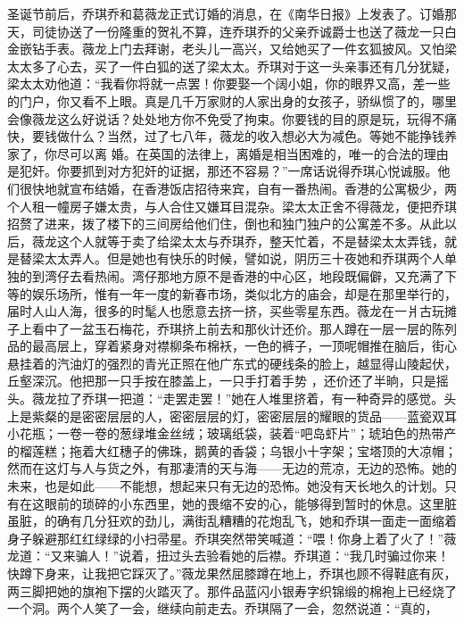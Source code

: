 \documentclass{article}
\begin{document}
圣诞节前后，乔琪乔和葛薇龙正式订婚的消息，在《南华日报》上发表了。订婚那天，司徒协送了一份隆重的贺礼不算，连乔琪乔的父亲乔诚爵士也送了薇龙一只白金嵌钻手表。薇龙上门去拜谢，老头儿一高兴，又给她买了一件玄狐披风。又怕梁太太多了心去，买了一件白狐的送了梁太太。乔琪对于这一头亲事还有几分犹疑，梁太太劝他道：“我看你将就一点罢！你要娶一个阔小姐，你的眼界又高，差一些的门户，你又看不上眼。真是几千万家财的人家出身的女孩子，骄纵惯了的，哪里会像薇龙这么好说话？处处地方你不免受了拘束。你要钱的目的原是玩，玩得不痛快，要钱做什么？当然，过了七八年，薇龙的收入想必大为减色。等她不能挣钱养家了，你尽可以离
\newpage
婚。在英国的法律上，离婚是相当困难的，唯一的合法的理由是犯奸。你要抓到对方犯奸的证据，那还不容易？”一席话说得乔琪心悦诚服。他们很快地就宣布结婚，在香港饭店招待来宾，自有一番热闹。香港的公寓极少，两个人租一幢房子嫌太贵，与人合住又嫌耳目混杂。梁太太正舍不得薇龙，便把乔琪招赘了进来，拨了楼下的三间房给他们住，倒也和独门独户的公寓差不多。从此以后，薇龙这个人就等于卖了给梁太太与乔琪乔，整天忙着，不是替梁太太弄钱，就是替梁太太弄人。但是她也有快乐的时候，譬如说，阴历三十夜她和乔琪两个人单独的到湾仔去看热闹。湾仔那地方原不是香港的中心区，地段既偏僻，又充满了下等的娱乐场所，惟有一年一度的新春市场，类似北方的庙会，却是在那里举行的，届时人山人海，很多的时髦人也愿意去挤一挤，买些零星东西。薇龙在一爿古玩摊子上看中了一盆玉石梅花，乔琪挤上前去和那伙计还价。那人蹲在一层一层的陈列品的最高层上，穿着紧身对襟柳条布棉袄，一色的裤子，一顶呢帽推在脑后，街心悬挂着的汽油灯的强烈的青光正照在他广东式的硬线条的脸上，越显得山陵起伏，丘壑深沉。他把那一只手按在膝盖上，一只手打着手势
\newpage
，还价还了半晌，只是摇头。薇龙拉了乔琪一把道：“走罢走罢！”她在人堆里挤着，有一种奇异的感觉。头上是紫粲的是密密层层的人，密密层层的灯，密密层层的耀眼的货品——蓝瓷双耳小花瓶；一卷一卷的葱绿堆金丝绒；玻璃纸袋，装着“吧岛虾片”；琥珀色的热带产的榴莲糕；拖着大红穗子的佛珠，鹅黄的香袋；乌银小十字架；宝塔顶的大凉帽；然而在这灯与人与货之外，有那凄清的天与海——无边的荒凉，无边的恐怖。她的未来，也是如此——不能想，想起来只有无边的恐怖。她没有天长地久的计划。只有在这眼前的琐碎的小东西里，她的畏缩不安的心，能够得到暂时的休息。这里脏虽脏，的确有几分狂欢的劲儿，满街乱糟糟的花炮乱飞，她和乔琪一面走一面缩着身子躲避那红红绿绿的小扫帚星。乔琪突然带笑喊道：“喂！你身上着了火了！”薇龙道：“又来骗人！”说着，扭过头去验看她的后襟。乔琪道：“我几时骗过你来！快蹲下身来，让我把它踩灭了。”薇龙果然屈膝蹲在地上，乔琪也顾不得鞋底有灰，两三脚把她的旗袍下摆的火踏灭了。那件品蓝闪小银寿字织锦缎的棉袍上已经烧了一个洞。两个人笑了一会，继续向前走去。乔琪隔了一会，忽然说道：“真的，
\newpage
\end{document}
